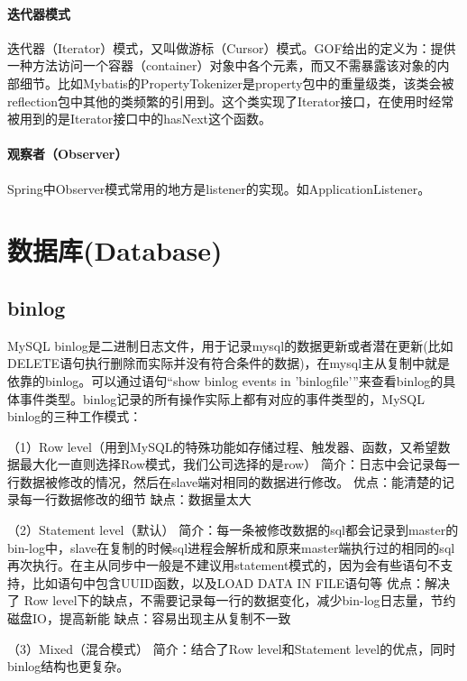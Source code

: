 \documentclass[../../../interview-questions.tex]{subfiles}
\begin{document}
\paragraph{迭代器模式}

迭代器（Iterator）模式，又叫做游标（Cursor）模式。GOF给出的定义为：提供一种方法访问一个容器（container）对象中各个元素，而又不需暴露该对象的内部细节。比如Mybatis的PropertyTokenizer是property包中的重量级类，该类会被reflection包中其他的类频繁的引用到。这个类实现了Iterator接口，在使用时经常被用到的是Iterator接口中的hasNext这个函数。

\paragraph{观察者（Observer）}


Spring中Observer模式常用的地方是listener的实现。如ApplicationListener。

\section{数据库(Database)}





\subsection{binlog}

MySQL binlog是二进制日志文件，用于记录mysql的数据更新或者潜在更新(比如DELETE语句执行删除而实际并没有符合条件的数据)，在mysql主从复制中就是依靠的binlog。可以通过语句“show binlog events in 'binlogfile'”来查看binlog的具体事件类型。binlog记录的所有操作实际上都有对应的事件类型的，MySQL binlog的三种工作模式：

（1）Row level（用到MySQL的特殊功能如存储过程、触发器、函数，又希望数据最大化一直则选择Row模式，我们公司选择的是row）
简介：日志中会记录每一行数据被修改的情况，然后在slave端对相同的数据进行修改。
优点：能清楚的记录每一行数据修改的细节
缺点：数据量太大

（2）Statement level（默认）
简介：每一条被修改数据的sql都会记录到master的bin-log中，slave在复制的时候sql进程会解析成和原来master端执行过的相同的sql再次执行。在主从同步中一般是不建议用statement模式的，因为会有些语句不支持，比如语句中包含UUID函数，以及LOAD DATA IN FILE语句等
优点：解决了 Row level下的缺点，不需要记录每一行的数据变化，减少bin-log日志量，节约磁盘IO，提高新能
缺点：容易出现主从复制不一致

（3）Mixed（混合模式）
简介：结合了Row level和Statement level的优点，同时binlog结构也更复杂。
\end{document}
